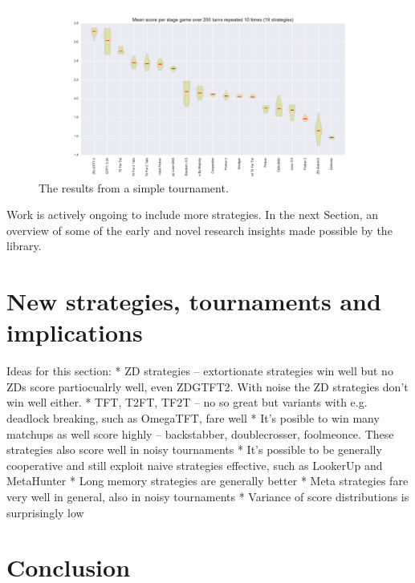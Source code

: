 \documentclass{article}
\begin{document}
\begin{figure}[!hbtp]
    \centering
    \includegraphics[width=.8\textwidth]{../img/stewart_tournament.pdf}
    \caption{The results from a simple tournament.}
    \label{fig:stewart_tournament}
\end{figure}

Work is actively ongoing to include more strategies. In the next Section, an
overview of some of the early and novel research insights made possible by the
library.

\section{New strategies, tournaments and implications}\label{sec:new-strategies-and-implications}

Ideas for this section:
* ZD strategies -- extortionate strategies win well but no ZDs score partiocualrly well,
even ZDGTFT2. With noise the ZD strategies don't win well either.
* TFT, T2FT, TF2T -- no so great but variants with e.g. deadlock breaking, such as OmegaTFT,
fare well
* It's posible to win many matchups as well score highly -- backstabber, doublecrosser,
foolmeonce. These strategies also score well in noisy tournaments
* It's possible to be generally cooperative and still exploit naive strategies effective,
such as LookerUp and MetaHunter
* Long memory strategies are generally better
* Meta strategies fare very well in general, also in noisy tournaments
* Variance of score distributions is surprisingly low


\section{Conclusion}\label{sec:conclusion}

\printbibliography
\end{document}

